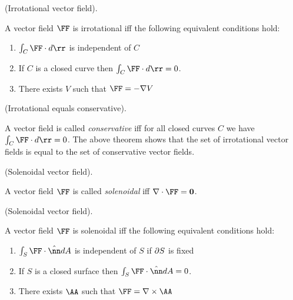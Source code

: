 \begin{theorem}
    (Irrotational vector field).

    A vector field $\FF$ is irrotational iff the following equivalent conditions hold:
    
    \begin{enumerate}
        \item $\int_C \FF \cdot d\rr$ is independent of $C$
        \item If $C$ is a closed curve then $\int_C \FF \cdot d\rr = 0$.
        \item There exists $V$ such that $\FF = -\nabla V$
    \end{enumerate}
\end{theorem}

\begin{remark}
    (Irrotational equals conservative).

    A vector field is called \textit{conservative} iff for all closed curves $C$ we have $\int_C \FF \cdot d\rr = 0$. The above theorem shows that the set of irrotational vector fields is equal to the set of conservative vector fields.
\end{remark}

\begin{defn}
    (Solenoidal vector field).

    A vector field $\FF$ is called \textit{solenoidal} iff $\nabla \cdot \FF = \mathbf{0}$.
\end{defn}

\begin{theorem}
    (Solenoidal vector field).

    A vector field $\FF$ is solenoidal iff the following equivalent conditions hold:

    \begin{enumerate}
        \item $\int_S \FF \cdot \hat{\nn} dA$ is independent of $S$ if $\partial S$ is fixed
        \item If $S$ is a closed surface then $\int_S \FF \cdot \hat{\nn} dA = 0$.
        \item There exists $\AA$ such that $\FF = \nabla \times \AA$
    \end{enumerate}
\end{theorem}

